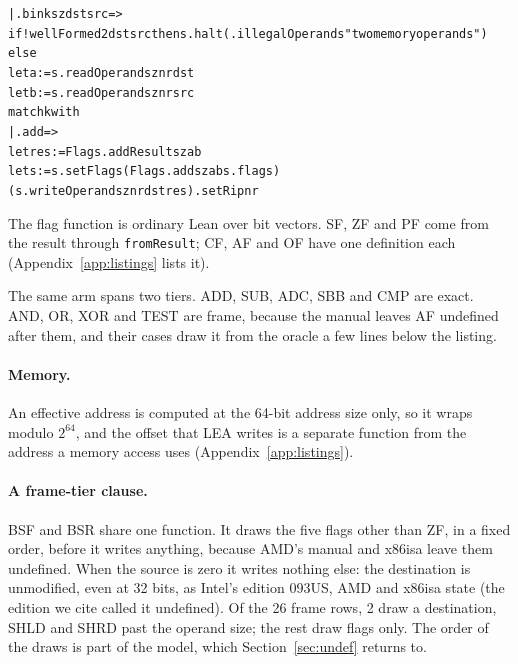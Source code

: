 \documentclass[runningheads]{llncs}
\newcommand{\src}[1]{}  %
\newcommand{\lean}[1]{\texttt{#1}}
\begin{document}
{\scriptsize
\begin{alltt}
  | .bin k sz dst src =>
      if !wellFormed2 dst src then s.halt (.illegalOperands "two memory operands")
      else
        let a := s.readOperand sz nr dst
        let b := s.readOperand sz nr src
        match k with
        | .add =>
            let res := Flags.addResult sz a b
            let s := s.setFlags (Flags.add sz a b s.flags)
            (s.writeOperand sz nr dst res).setRip nr
\end{alltt}
}

The flag function is ordinary Lean over bit vectors. SF, ZF and PF come from the result through
\lean{fromResult}; CF, AF and OF have one definition each (Appendix~\ref{app:listings} lists it).
\src{X86/Flags.lean addResult, addCF, addOF, add}


The same arm spans two tiers. ADD, SUB, ADC, SBB and CMP are exact. AND, OR, XOR and TEST are frame,
because the manual leaves AF undefined after them, and their cases draw it from the oracle a few lines
below the listing.
\src{X86/Semantics.lean step, the .and/.or/.xor cases of the .bin arm, each with s.undefBit for AF; docs/COVERAGE.md and/or/xor/test rows}

\paragraph{Memory.}
An effective address is computed at the 64-bit address size only, so it wraps modulo $2^{64}$, and the offset that
LEA writes is a separate function from the address a memory access uses (Appendix~\ref{app:listings}).

\paragraph{A frame-tier clause.}
BSF and BSR share one function. It draws the five flags other than ZF, in a fixed order, before it
writes anything, because AMD's manual and x86isa leave them undefined. When the source is zero it writes
nothing else: the destination is unmodified, even at 32 bits, as Intel's edition 093US, AMD and x86isa
state (the edition we cite called it undefined). Of the 26 frame rows, 2 draw a destination, SHLD and
SHRD past the operand size; the rest draw flags only. The order of the draws is part of the model,
which Section~\ref{sec:undef} returns to.
\src{X86/Semantics.lean bitScanStep, called from step for bsf and bsr, and the .dshift arm; docs/DECISIONS.md D346 (093US Vol.~2A BSF/BSR,
AMD APM Vol.~3, x86isa machine/instructions/bit.lisp; 093US defines the five flags except on some older processors, D346 keeps them drawn by the union rule; the model drew the destination until D346, on D40); Tests/Nonvacuity.lean bsf\_dest\_upper\_kept\_at\_zero\_source\_d; docs/CLAIMS.tsv[tier\_frame, frame\_dest\_draw]}
\end{document}
